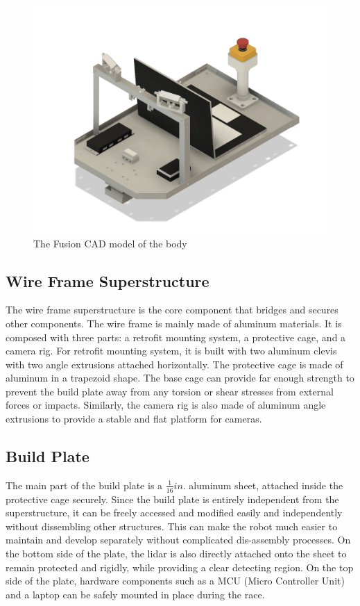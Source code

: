 \documentclass[11pt,journal]{IEEEtran}
\begin{document}
\begin{figure}[ht]
\centerline{\includegraphics[width=0.9\columnwidth]{2018DesignMech.png}}
\caption{The Fusion CAD model of the body}
\label{Body1}
\end{figure}

\subsection{Wire Frame Superstructure}
The wire frame superstructure is the core component that bridges and secures other components. The wire frame is mainly made of aluminum materials. It is composed with three parts: a retrofit mounting system, a protective cage, and a camera rig. For retrofit mounting system, it is built with two aluminum clevis with two angle extrusions attached horizontally. The protective cage is made of aluminum in a trapezoid shape. The base cage can provide far enough strength to prevent the build plate away from any torsion or shear stresses from external forces or impacts. Similarly, the camera rig is also made of aluminum angle extrusions to provide a stable and flat platform for cameras. 

\subsection{Build Plate}
The main part of the build plate is a $\frac{1}{16} in.$ aluminum sheet, attached inside the protective cage securely. Since the build plate is entirely independent from the superstructure, it can be freely accessed and modified easily and independently without dissembling other structures. This can make the robot much easier to maintain and develop separately without complicated dis-assembly processes. On the bottom side of the plate, the lidar is also directly attached onto the sheet to remain protected and rigidly, while providing a clear detecting region. On the top side of the plate, hardware components such as a MCU (Micro Controller Unit) and a laptop can be safely mounted in place during the race.
\end{document}
